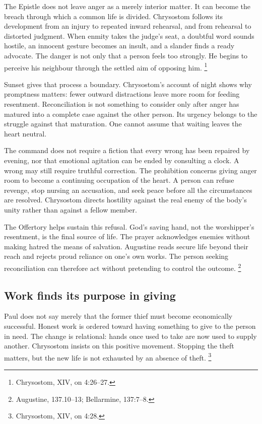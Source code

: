 The Epistle does not leave anger as a merely interior matter.
It can become the breach through which a common life is
divided. Chrysostom follows its development from an injury
to repeated inward rehearsal, and from rehearsal to distorted
judgment. When enmity takes the judge's seat, a doubtful
word sounds hostile, an innocent gesture becomes an insult,
and a slander finds a ready advocate. The danger is not only
that a person feels too strongly. He begins to perceive
his neighbour through the settled aim of opposing him.
\footnote{Chrysostom,  XIV, on 4:26--27.}

Sunset gives that process a boundary. Chrysostom's account
of night shows why promptness matters: fewer outward
distractions leave more room for feeding resentment.
Reconciliation is not something to consider only after
anger has matured into a complete case against the other
person. Its urgency belongs to the struggle against that
maturation. One cannot assume that waiting leaves the
heart neutral.

The command does not require a fiction that every wrong
has been repaired by evening, nor that emotional agitation
can be ended by consulting a clock. A wrong may still
require truthful correction. The prohibition concerns
giving anger room to become a continuing occupation of
the heart. A person can refuse revenge, stop nursing an
accusation, and seek peace before all the circumstances
are resolved. Chrysostom directs hostility against the
real enemy of the body's unity rather than against a
fellow member.

The Offertory helps sustain this refusal. God's saving
hand, not the worshipper's resentment, is the final source
of life. The prayer acknowledges enemies without making
hatred the means of salvation. Augustine reads secure
life beyond their reach and rejects proud reliance on
one's own works. The person seeking reconciliation can
therefore act without pretending to control the outcome.
\footnote{Augustine,  137.10--13;
Bellarmine,  137:7--8.}

\subsection{Work finds its purpose in giving}

Paul does not say merely that the former thief must become
economically successful. Honest work is ordered toward
having something to give to the person in need. The
change is relational: hands once used to take are now
used to supply another. Chrysostom insists on this
positive movement. Stopping the theft matters, but the
new life is not exhausted by an absence of theft.
\footnote{Chrysostom,  XIV, on 4:28.}

